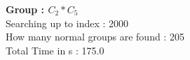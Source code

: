 \textbf{Group : $C_2*C_5$}\\
Searching up to index : 2000\\
How many normal groups are found : 205\\
Total Time in s : 175.0\\

